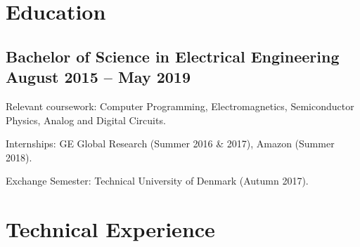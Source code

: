 
\section{Education}

\subsection{{Bachelor of Science in Electrical Engineering \hfill August 2015 – May 2019}}
\begin{zitemize}
    \item Relevant coursework: Computer Programming, Electromagnetics, Semiconductor Physics, Analog and Digital Circuits.
    \item Internships: GE Global Research (Summer 2016 \& 2017), Amazon (Summer 2018).
    \item Exchange Semester: Technical University of Denmark (Autumn 2017).
\end{zitemize}
\vspace{6pt}


\section{Technical Experience}

